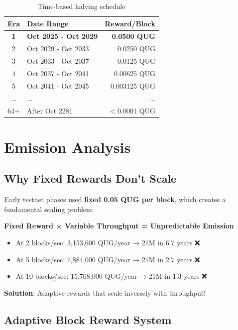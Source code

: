 \documentclass[11pt,a4paper]{article}
\begin{document}
\begin{table}[h]
\centering
\small
\begin{tabular}{clr}
\toprule
\textbf{Era} & \textbf{Date Range} & \textbf{Reward/Block} \\
\midrule
\textbf{1} & \textbf{Oct 2025 - Oct 2029} & \textbf{0.0500 QUG} \\
2 & Oct 2029 - Oct 2033 & 0.0250 QUG \\
3 & Oct 2033 - Oct 2037 & 0.0125 QUG \\
4 & Oct 2037 - Oct 2041 & 0.00625 QUG \\
5 & Oct 2041 - Oct 2045 & 0.003125 QUG \\
... & ... & ... \\
64+ & After Oct 2281 & $<$0.0001 QUG \\
\bottomrule
\end{tabular}
\caption{Time-based halving schedule}
\end{table}

\section{Emission Analysis}

\subsection{Why Fixed Rewards Don't Scale}

\begin{tcolorbox}[colback=red!10, colframe=red, title=❌ Problem with Fixed Rewards]
Early testnet phases used \textbf{fixed 0.05 QUG per block}, which creates a fundamental scaling problem:

\textbf{Fixed Reward × Variable Throughput = Unpredictable Emission}

\begin{itemize}
    \item At 2 blocks/sec: 3,153,600 QUG/year → 21M in 6.7 years ❌
    \item At 5 blocks/sec: 7,884,000 QUG/year → 21M in 2.7 years ❌
    \item At 10 blocks/sec: 15,768,000 QUG/year → 21M in 1.3 years ❌
\end{itemize}

\textbf{Solution}: Adaptive rewards that scale inversely with throughput!
\end{tcolorbox}

\subsection{Adaptive Block Reward System}
\end{document}

